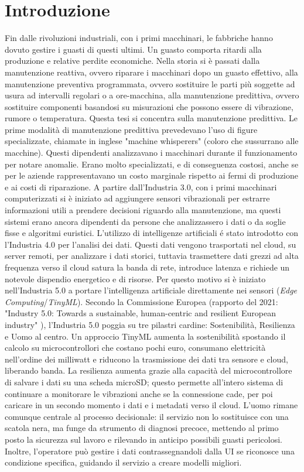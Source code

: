 \chapter*{Introduzione}

Fin dalle rivoluzioni industriali, con i primi macchinari, le fabbriche hanno dovuto gestire i guasti di questi ultimi. Un guasto comporta ritardi alla produzione e relative perdite economiche. Nella storia si è passati dalla manutenzione reattiva, ovvero riparare i macchinari dopo un guasto effettivo, alla manutenzione preventiva programmata, ovvero sostituire le parti più soggette ad usura ad intervalli regolari o a ore-macchina, alla manutenzione predittiva, ovvero sostituire componenti basandosi su misurazioni che possono essere di vibrazione, rumore o temperatura. Questa tesi si concentra sulla manutenzione predittiva.
Le prime modalità di manutenzione predittiva prevedevano l'uso di figure specializzate, chiamate in inglese "machine whisperers" (coloro che sussurrano alle macchine). Questi dipendenti analizzavano i macchinari durante il funzionamento per notare anomalie. Erano molto specializzati, e di conseguenza costosi, anche se per le aziende rappresentavano un costo marginale rispetto ai fermi di produzione e ai costi di riparazione.
A partire dall'Industria 3.0, con i primi macchinari computerizzati si è iniziato ad aggiungere sensori vibrazionali per estrarre informazioni utili a prendere decisioni riguardo alla manutenzione, ma questi sistemi erano ancora dipendenti da persone che analizzassero i dati o da soglie fisse e algoritmi euristici.
L'utilizzo di intelligenze artificiali é stato introdotto con l'Industria 4.0 per l'analisi dei dati. Questi dati vengono trasportati nel cloud, su server remoti, per analizzare i dati storici, tuttavia trasmettere dati grezzi ad alta frequenza verso il cloud satura la banda di rete, introduce latenza e richiede un notevole dispendio energetico e di risorse. Per questo motivo si è iniziato nell'Industria 5.0 a portare l'intelligenza artificiale direttamente nei sensori (\textit{Edge Computing}/\textit{TinyML}).
Secondo la Commissione Europea (rapporto del 2021: "Industry 5.0: Towards a sustainable, human-centric and resilient European industry" \cite{eu_industry50_2021}), l'Industria 5.0 poggia su tre pilastri cardine: Sostenibilità, Resilienza e Uomo al centro. 
Un approccio TinyML aumenta la sostenibilità spostando il calcolo su microcontrollori che costano pochi euro, consumano elettricità nell'ordine dei milliwatt e riducono la trasmissione dei dati tra sensore e cloud, liberando banda. La resilienza aumenta grazie alla capacità del microcontrollore di salvare i dati su una scheda microSD; questo permette all'intero sistema di continuare a monitorare le vibrazioni anche se la connessione cade, per poi caricare in un secondo momento i dati e i metadati verso il cloud. L'uomo rimane comunque centrale al processo decisionale: il servizio non lo sostituisce con una scatola nera, ma funge da strumento di diagnosi precoce, mettendo al primo posto la sicurezza sul lavoro e rilevando in anticipo possibili guasti pericolosi. Inoltre, l'operatore può gestire i dati contrassegnandoli dalla UI se riconosce una condizione specifica, guidando il servizio a creare modelli migliori.
